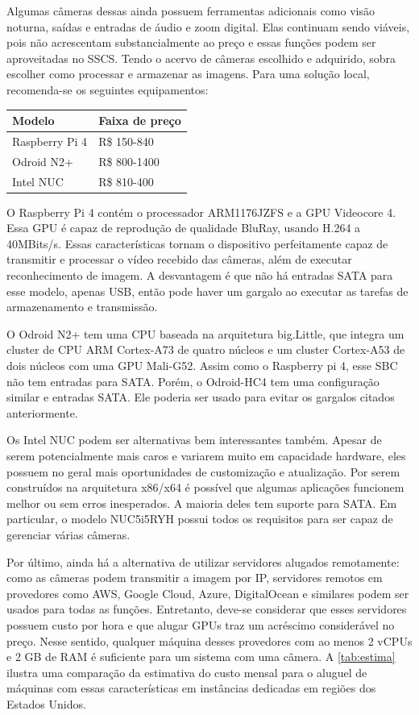 \documentclass[12pt, %
openright, 
oneside, %
a4paper,    %
brazil]{facom-ufu-abntex2}
\begin{document}
Algumas câmeras dessas ainda possuem ferramentas adicionais como visão noturna,
saídas e entradas de áudio e zoom digital. Elas continuam sendo viáveis, pois
não acrescentam substancialmente ao preço e essas funções podem ser
aproveitadas no SSCS. Tendo o acervo de câmeras escolhido e adquirido, sobra
escolher como processar e  armazenar as imagens. Para uma solução local,
recomenda-se os seguintes equipamentos:

\begin{center}
	\begin{tabular}{|l|l|}
		\hline
		Modelo         & Faixa de preço
		\\ \hline
		Raspberry Pi 4 & R\$ 150-840
		\\ \hline
		Odroid N2+     & R\$ 800-1400
		\\ \hline
		Intel NUC      & R\$ 810-400
		\\ \hline
	\end{tabular}
\end{center}

O Raspberry Pi 4 contém o processador ARM1176JZFS e a GPU Videocore 4. Essa GPU
é capaz de reprodução de qualidade BluRay, usando H.264 a 40MBits/s. Essas
características tornam o dispositivo perfeitamente capaz de transmitir e
processar o vídeo recebido das câmeras, além de executar reconhecimento de
imagem. A desvantagem é que não há entradas SATA para esse modelo, apenas USB,
então pode haver um gargalo ao executar as tarefas de armazenamento e
transmissão.

O Odroid N2+ tem uma CPU baseada na arquitetura big.Little, que integra um
cluster de CPU ARM Cortex-A73  de quatro núcleos e um cluster Cortex-A53 de
dois núcleos com uma GPU Mali-G52. Assim como o Raspberry pi 4, esse SBC não
tem entradas para SATA. Porém, o Odroid-HC4 tem uma configuração similar e
entradas SATA. Ele poderia ser usado para evitar os gargalos citados
anteriormente.

Os Intel NUC podem ser alternativas bem interessantes também. Apesar de serem
potencialmente mais caros e variarem muito em capacidade hardware, eles possuem
no geral mais oportunidades de customização e atualização. Por serem
construídos na arquitetura x86/x64 é possível que algumas aplicações funcionem
melhor ou sem erros inesperados. A maioria deles tem suporte para SATA. Em
particular, o modelo NUC5i5RYH possui todos os requisitos para ser capaz de
gerenciar várias câmeras.

Por último, ainda há a alternativa de utilizar servidores alugados remotamente:
como as câmeras podem transmitir a imagem por IP, servidores remotos em
provedores como AWS, Google Cloud, Azure, DigitalOcean e similares podem ser
usados para todas as funções. Entretanto, deve-se considerar que esses
servidores possuem custo por hora e que alugar GPUs traz um acréscimo
considerável no preço. Nesse sentido, qualquer máquina desses provedores com ao
menos 2 vCPUs e 2 GB de RAM é suficiente para um sistema com uma câmera. A
\autoref{tab:estima} ilustra uma comparação da estimativa do custo mensal para
o aluguel de máquinas com essas características em instâncias dedicadas em
regiões dos Estados Unidos.
\end{document}
